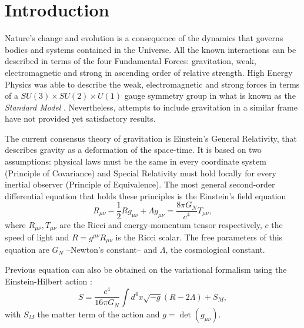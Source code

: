 \chapter{Introduction}
\label{ch:introduction}
Nature's change and evolution is a consequence of the dynamics that governs bodies and systems contained in the Universe. All the known interactions can be described in terms of the four Fundamental Forces: gravitation, weak, electromagnetic and strong in ascending order of relative strength. High Energy Physics was able to describe the weak, electromagnetic and strong forces in terms of a $SU(3)\times SU(2)\times U(1)$ gauge symmetry group in what is known as the {\it Standard Model} \cite{halzen1984quarks,peskin1995introduction,weinberg1995quantum,weinberg1996quantum,2000hep.ph....1283N}. Nevertheless, attempts to include gravitation in a similar frame have not provided yet satisfactory results.
\newline

The current consensus theory of gravitation is Einstein's General Relativity, that describes gravity as a deformation of the space-time. It is based on two assumptions: physical laws must be the same in every coordinate system (Principle of Covariance) and Special Relativity must hold locally for every inertial observer (Principle of Equivalence). The most general second-order differential equation that holds these principles is the Einstein's field equation \cite{ANDP:ANDP19163540702,1916AnP...354..769E,1917SPAW.......142E,2001LRR.....4....1C}
\begin{equation}
R_{\mu\nu}-\frac{1}{2}Rg_{\mu\nu} + \Lambda g_{\mu\nu} = \frac{8\pi G_N}{c^4}T_{\mu\nu},
\label{eq:einsteinbare}
\end{equation}
where $R_{\mu\nu},T_{\mu\nu}$ are the Ricci and energy-momentum tensor respectively, $c$ the speed of light and $R=g^{\mu\nu}R_{\mu\nu}$ is the Ricci scalar. The free parameters of this equation are $G_N$ --Newton's constant-- and $\Lambda$, the cosmological constant.
\newline

Previous equation can also be obtained on the variational formalism using the Einstein-Hilbert action \cite{Hilbert:1915tx}:
\begin{equation}
S = \frac{c^4}{16\pi G_N}\int d^4x\sqrt{-g}(R-2\Lambda)+S_M,
\label{eq:ehaction}
\end{equation}
with $S_M$ the matter term of the action and $g=\det(g_{\mu\nu})$.

